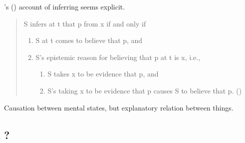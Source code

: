 \begin{note}
  \citeauthor{Longino:1978wv}'s (\citeyear{Longino:1978wv}) account of inferring seems explicit.
  \begin{quote}
    S infers at t that p from x if and only if
    \begin{enumerate}[label=\arabic*]
    \item
      S at t comes to believe that p, and
    \item
      S's epistemic reason for believing that p at t is x, i.e.,
      \begin{enumerate}[label=\alph*]
      \item
        S takes x to be evidence that p, and
      \item
        S's taking x to be evidence that p causes S to believe that p.\newline
        \mbox{}\hfill\mbox{(\citeyear[22]{Longino:1978wv})}
      \end{enumerate}
    \end{enumerate}
  \end{quote}
  Causation between mental states, but explanatory relation between things.
\end{note}

\subsection{?}

